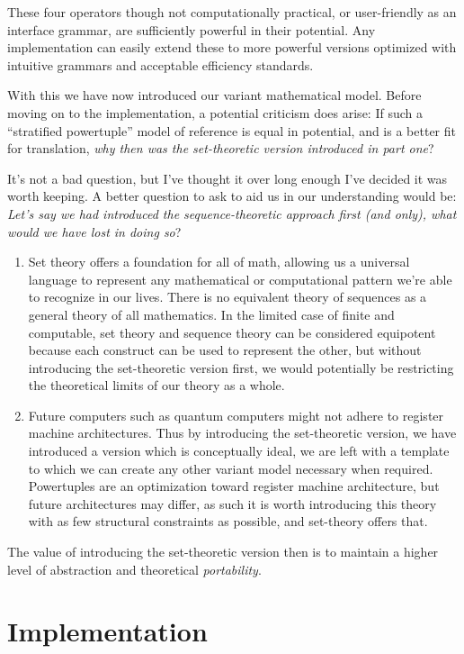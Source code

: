\documentclass[twoside]{article}
\begin{document}
These four operators though not computationally practical, or user-friendly as an interface grammar, are sufficiently powerful
in their potential. Any implementation can easily extend these to more powerful versions optimized with intuitive grammars
and acceptable efficiency standards.

With this we have now introduced our variant mathematical model. Before moving on to the implementation, a potential criticism
does arise: If such a ``stratified powertuple'' model of reference is equal in potential, and is a better fit for translation,
\emph{why then was the set-theoretic version introduced in part one}?

It's not a bad question, but I've thought it over long enough I've decided it was worth keeping. A better question to ask to
aid us in our understanding would be: \emph{Let's say we had introduced the sequence-theoretic approach first (and only),
what would we have lost in doing so}?

\begin{enumerate}
\item Set theory offers a foundation for all of math, allowing us a universal language to represent any mathematical
      or computational pattern we're able to recognize in our lives. There is no equivalent theory of sequences as
      a general theory of all mathematics. In the limited case of finite and computable, set theory and sequence theory
      can be considered equipotent because each construct can be used to represent the other, but without introducing
      the set-theoretic version first, we would potentially be restricting the theoretical limits of our theory as a whole.
\item Future computers such as quantum computers might not adhere to register machine architectures. Thus by introducing
      the set-theoretic version, we have introduced a version which is conceptually ideal, we are left with a template
      to which we can create any other variant model necessary when required. Powertuples are an optimization toward register
      machine architecture, but future architectures may differ, as such it is worth introducing this theory with as few
      structural constraints as possible, and set-theory offers that.
\end{enumerate}
The value of introducing the set-theoretic version then is to maintain a higher level of abstraction and theoretical
\emph{portability}.

\section*{Implementation}
\end{document}
